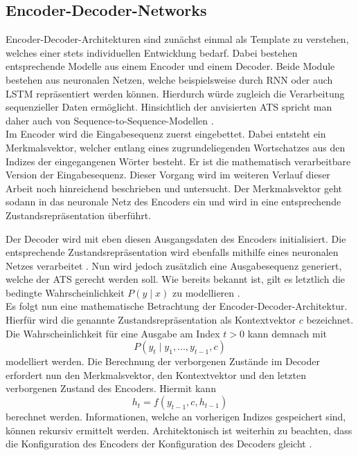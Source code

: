 \subsection{Encoder-Decoder-Networks}
\noindent
Encoder-Decoder-Architekturen sind zunächst einmal als Template zu verstehen, welches einer stets individuellen Entwicklung bedarf. Dabei bestehen entsprechende Modelle aus einem Encoder und einem Decoder. Beide Module bestehen aus neuronalen Netzen, welche beispielsweise durch \ac{RNN} oder auch \ac{LSTM} repräsentiert werden können. Hierdurch würde zugleich die Verarbeitung sequenzieller Daten ermöglicht. Hinsichtlich der anvisierten \ac{ATS} spricht man daher auch von Sequence-to-Sequence-Modellen \cite[S.~2]{VAS17}.\\

\noindent
Im Encoder wird die Eingabesequenz zuerst eingebettet. Dabei entsteht ein Merkmalsvektor, welcher entlang eines zugrundeliegenden Wortschatzes aus den Indizes der eingegangenen Wörter besteht. Er ist die mathematisch verarbeitbare Version der Eingabesequenz. Dieser Vorgang wird im weiteren Verlauf dieser Arbeit noch hinreichend beschrieben und untersucht. Der Merkmalsvektor geht sodann in das neuronale Netz des Encoders ein und wird in eine entsprechende Zustandsrepräsentation überführt.
\newpage

\noindent
Der Decoder wird mit eben diesen Ausgangsdaten des Encoders initialisiert. Die entsprechende Zustandsrepräsentation wird ebenfalls mithilfe eines neuronalen Netzes verarbeitet \cite[S.~2]{VAS17}. Nun wird jedoch zusätzlich eine Ausgabesequenz generiert, welche der \ac{ATS} gerecht werden soll. Wie bereits bekannt ist, gilt es letztlich die bedingte Wahrscheinlichkeit $P(y \mid x)$ zu modellieren \cite{YAN19}.\\

\noindent
Es folgt nun eine mathematische Betrachtung der Encoder-Decoder-Architektur. Hierfür wird die genannte Zustandsrepräsentation als Kontextvektor $c$ bezeichnet. Die Wahrscheinlichkeit für eine Ausgabe am Index $t > 0$ kann demnach mit $$P(y_t \mid y_1, ..., y_{t-1}, c)$$ modelliert werden. Die Berechnung der verborgenen Zustände im Decoder erfordert nun den Merkmalsvektor, den Kontextvektor und den letzten verborgenen Zustand des Encoders. Hiermit kann $$h_t = f(y_{t-1}, c, h_{t-1})$$ berechnet werden. Informationen, welche an vorherigen Indizes gespeichert sind, können rekursiv ermittelt werden. Architektonisch ist weiterhin zu beachten, dass die Konfiguration des Encoders der Konfiguration des Decoders gleicht \cite[S.~2]{VAS17}.\\

